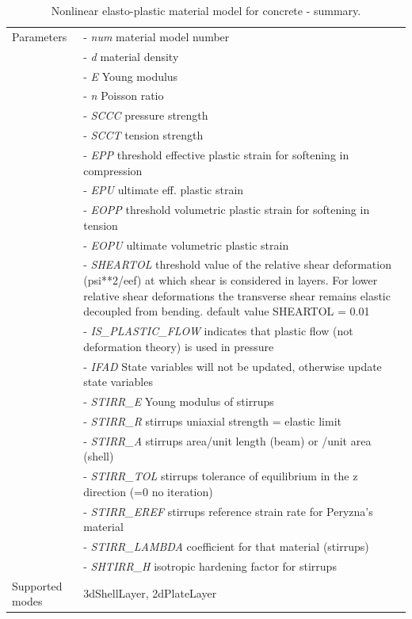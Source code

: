 \documentclass[a4paper]{article}
\newcommand{\param}[1]{{\it #1}}
\newenvironment{mmt}{\begin{tabular}{|l|p{9cm}|}}{\end{tabular}\\}
\newenvironment{mmt}{\begin{tabular}{|l|l|}}{\end{tabular}\\}
\begin{document}
\begin{table}[!htb]
\begin{mmt}
Parameters &- \param{num} material model number\\
&- \param{d} material density\\
&- \param{E} Young modulus\\
&- \param{n} Poisson ratio\\
&- \param{SCCC} pressure strength\\
&- \param{SCCT} tension strength\\
&- \param{EPP} threshold effective plastic strain for softening in
compression\\
&- \param{EPU} ultimate eff. plastic strain\\
&- \param{EOPP} threshold volumetric plastic strain for softening in
tension\\
&- \param{EOPU} ultimate volumetric plastic strain\\
&- \param{SHEARTOL} threshold value of the relative shear deformation
(psi**2/eef) at which shear is considered in layers.
For lower relative shear deformations the transverse shear remains elastic decoupled from bending. default value
SHEARTOL = 0.01\\
&- \param{IS\_PLASTIC\_FLOW} indicates that plastic flow (not
deformation theory) is used in pressure\\
&- \param{IFAD} State variables will not be updated, otherwise update state variables\\
&- \param{STIRR\_E} Young modulus of stirrups\\
&- \param{STIRR\_R} stirrups uniaxial strength = elastic limit\\
&- \param{STIRR\_A} stirrups area/unit length (beam) or /unit area (shell)\\
&- \param{STIRR\_TOL} stirrups tolerance of equilibrium in the z direction (=0 no iteration)\\
&- \param{STIRR\_EREF} stirrups reference strain rate for Peryzna's
material\\
&- \param{STIRR\_LAMBDA} coefficient for that material (stirrups)\\
&- \param{SHTIRR\_H} isotropic hardening factor for stirrups\\
Supported modes& 3dShellLayer, 2dPlateLayer\\
\hline
\end{mmt}
\caption{Nonlinear elasto-plastic material model for concrete - summary.}
\label{Rer_table}
\end{table}
\end{document}
